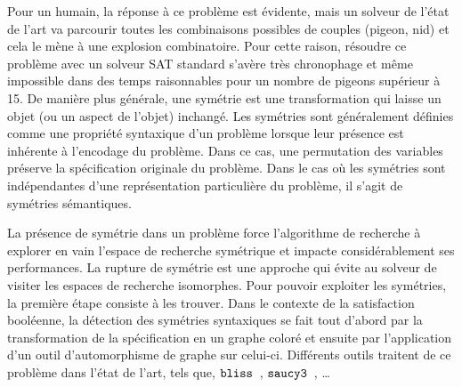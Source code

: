 Pour un humain, la réponse à ce problème est évidente, mais un solveur de l'état de l'art va parcourir toutes 
les combinaisons possibles de couples (pigeon, nid) et cela le mène à une explosion combinatoire.
Pour cette raison, résoudre ce problème avec un solveur SAT standard s'avère très chronophage et même impossible 
dans des temps raisonnables pour un nombre de pigeons supérieur à 15.
%
%
De manière plus  générale, une symétrie est une transformation qui laisse un objet (ou un aspect de l'objet) inchangé. Les symétries sont généralement définies comme une propriété syntaxique d'un problème lorsque leur présence est inhérente à l'encodage du problème.
Dans ce cas, une permutation des variables préserve la spécification originale du problème.
Dans le cas où les symétries sont indépendantes d'une représentation particulière du problème, il s'agit de symétries sémantiques.

La présence de symétrie dans un problème force l'algorithme de recherche à explorer en vain l'espace de recherche symétrique et impacte considérablement ses performances.  La rupture de symétrie est une approche qui évite au solveur de visiter les espaces de recherche isomorphes.
Pour pouvoir exploiter les symétries, la première étape consiste à les trouver. Dans le contexte de la satisfaction booléenne, la détection des symétries syntaxiques se fait tout d'abord par la transformation de la spécification en un graphe coloré et ensuite par l'application d'un outil d'automorphisme de graphe sur celui-ci.
Différents outils traitent de ce problème dans l'état de l'art, tels que, $\texttt{bliss}$~\cite{JunttilaKaski:ALENEX2007}, $\texttt{saucy3}$~\cite{katebi2010symmetry}, …


